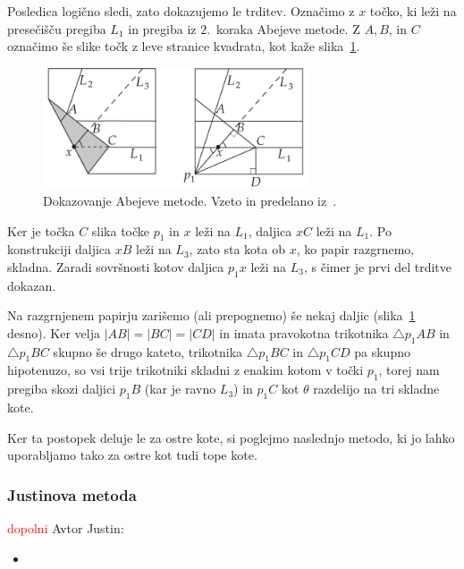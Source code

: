 \begin{dokaz}
    Posledica logično sledi, zato dokazujemo le trditev. Označimo z $x$ točko, ki leži na presečišču pregiba $L_1$ in pregiba iz $2$.\ koraka Abejeve metode. Z $A, B$, in $C$ označimo še slike točk z leve stranice kvadrata, kot kaže slika~\ref{fig:abe_2}.
    \begin{figure}[h]
        \centering
        \includegraphics[width=0.7\textwidth]{images/starogr_problemi/abe_trisekcija.png}
        \caption[Abejeva metoda ($2$.\ del)]{Dokazovanje Abejeve metode. Vzeto in predelano iz~\cite[str.\ 65]{hull2013}.}
        \label{fig:abe_2}
    \end{figure}
    Ker je točka $C$ slika točke $p_1$ in $x$ leži na $L_1$, daljica $xC$ leži na $L_1$. Po konstrukciji daljica $xB$ leži na $L_3$, zato sta kota ob $x$, ko papir razgrnemo, skladna. Zaradi sovršnosti kotov daljica $p_1x$ leži na $L_3$, s čimer je prvi del trditve dokazan.
    
    Na razgrnjenem papirju zarišemo (ali prepognemo) še nekaj daljic (slika~\ref{fig:abe_2} desno). Ker velja $|AB| = |BC| = |CD|$ in imata pravokotna trikotnika $\triangle p_1AB$ in $\triangle p_1BC$ skupno še drugo kateto, trikotnika $\triangle p_1BC$ in $\triangle p_1CD$ pa skupno hipotenuzo, so vsi trije trikotniki skladni z enakim kotom v točki $p_1$, torej nam pregiba skozi daljici $p_1B$ (kar je ravno $L_3$) in $p_1C$ kot $\theta$ razdelijo na tri skladne kote.
\end{dokaz}

Ker ta postopek deluje le za ostre kote, si poglejmo naslednjo metodo, ki jo lahko uporabljamo tako za ostre kot tudi tope kote.

\subsubsection*{Justinova metoda}

\textcolor{red}{dopolni}
Avtor Justin:
\begin{itemize}
    \item \cite[str.\ 34]{lang2013}
\end{itemize}

